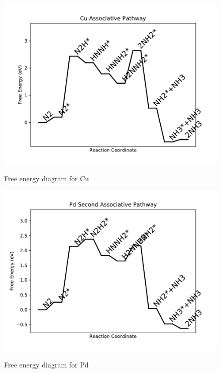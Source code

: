 \documentclass{article}
\begin{document}
\newpage
\begin{figure}
\includegraphics[width=1\linewidth]{data/plots/Cu_associative.pdf}
\label{fig:Cu_associative}
\caption{Free energy diagram for Cu}
\end{figure}

\begin{figure}
\includegraphics[width=1\linewidth]{data/plots/Pd_associative_2.pdf}
\label{fig:Pd_associative_2}
\caption{Free energy diagram for Pd}
\end{figure}
\end{document}
